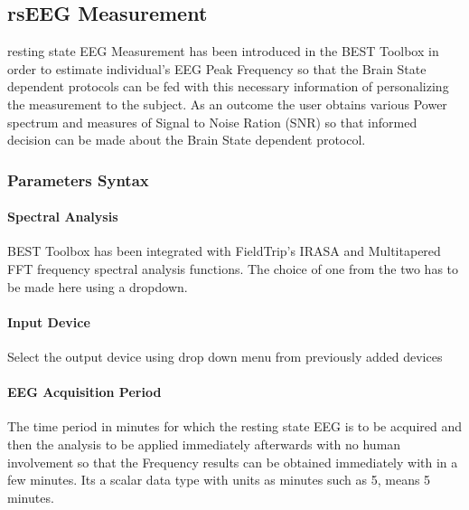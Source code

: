 \documentclass[letterpaper,10pt,english]{sphinxmanual}
\begin{document}
\subsection{rsEEG Measurement}
\label{\detokenize{10_rsEEGMeasurement:rseeg-measurement}}\label{\detokenize{10_rsEEGMeasurement::doc}}
\sphinxAtStartPar
resting state EEG Measurement has been introduced in the BEST Toolbox in order to estimate individual’s EEG Peak Frequency so that the Brain State dependent protocols can be fed with this necessary information of personalizing the measurement to the subject. As an outcome the user obtains various Power spectrum and measures of Signal to Noise Ration (SNR) so that informed decision can be made about the Brain State dependent protocol.


\subsubsection{Parameters Syntax}
\label{\detokenize{10_rsEEGMeasurement:parameters-syntax}}

\paragraph{Spectral Analysis}
\label{\detokenize{10_rsEEGMeasurement:spectral-analysis}}
\sphinxAtStartPar
BEST Toolbox has been integrated with FieldTrip’s IRASA and Multi\sphinxhyphen{}tapered FFT frequency spectral analysis functions. The choice of one from the two has to be made here using a drop\sphinxhyphen{}down.


\paragraph{Input Device}
\label{\detokenize{10_rsEEGMeasurement:input-device}}
\sphinxAtStartPar
Select the output device using drop down menu from previously added devices


\paragraph{EEG Acquisition Period}
\label{\detokenize{10_rsEEGMeasurement:eeg-acquisition-period}}
\sphinxAtStartPar
The time period in minutes for which the resting state EEG is to be acquired and then the analysis to be applied immediately afterwards with no human involvement so that the Frequency results can be obtained immediately with in a few minutes. Its a scalar data type with units as minutes such as 5, means 5 minutes.
\end{document}
